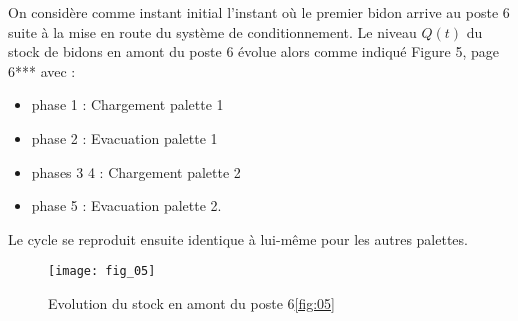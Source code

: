 
On considère comme instant initial l’instant où le premier bidon arrive au poste 6 suite à la 
mise en route du système de conditionnement. Le niveau $Q(t)$ du stock de bidons en amont du 
poste 6 évolue alors comme indiqué Figure 5, page 6*** avec :
\begin{itemize}
\item phase 1 : Chargement palette 1 
\item phase 2 : Evacuation palette 1 
\item phases 3 4 : Chargement palette 2 
\item phase 5 : Evacuation palette 2.
\end{itemize}

Le cycle se reproduit ensuite identique à lui-même pour les autres palettes. 


\begin{figure}[H]
\centering
\texttt{[image: fig\_05]}
\caption{Evolution du stock en amont du poste 6\ref{fig:05}}
\end{figure}


